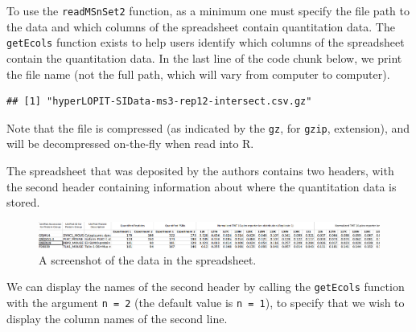 To use the \texttt{readMSnSet2} function, as a minimum one must specify the
file path to the data and which columns of the spreadsheet contain
quantitation data. The \texttt{getEcols} function exists to help users
identify which columns of the spreadsheet contain the
quantitation data. In the last line of the code chunk below, we print
the file name (not the full path, which will vary from computer to
computer). 


\begin{knitrout}
\color{fgcolor}\begin{kframe}
\begin{alltt}
\hlstd{(}\hlstd{)}
 \hlkwb{<-} \hlstd{(}\hlstd{,}  \hlstd{=} \hlstd{)}
 \hlkwb{<-}   \hlstd{=} \hlstd{,}
           \hlstd{=} \hlstd{)}
\end{alltt}
\begin{verbatim}
## [1] "hyperLOPIT-SIData-ms3-rep12-intersect.csv.gz"
\end{verbatim}
\end{kframe}
\end{knitrout}

Note that the file is compressed (as indicated by the \texttt{gz}, for
\texttt{gzip}, extension), and will be decompressed on-the-fly when
read into R.

The spreadsheet that was deposited by the authors contains two
headers, with the second header containing information about where the
quantitation data is stored. 

\begin{figure}[!ht]
  \centering
  \includegraphics[width=.65\textwidth]{./Figures/spreadsheet-screenshot.png}
  \caption{A screenshot of the data in the spreadsheet.}
  \label{fig:spreadsheet}
\end{figure}


We can display the names of the second header by calling the
\texttt{getEcols} function with the argument \texttt{n = 2} (the default value is \texttt{n
= 1}), to specify that we wish to display the column names of the
second line.


